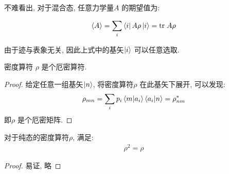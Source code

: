 不难看出, 对于混合态, 任意力学量$A$ 的期望值为:

\begin{equation}
  \begin{aligned}
    \langle A\rangle = \sum_{i} \bra{i}A \rho \ket{i} = {\rm tr} \;A \rho
  \end{aligned}
\end{equation}

由于迹与表象无关, 因此上式中的基矢$\ket{i}$ 可以任意选取.

\begin{theorem}
  密度算符 $\rho$ 是个厄密算符.
\end{theorem}
\begin{proof}
  给定任意一组基矢$\ket{n}$, 将密度算符$\rho$ 在此基矢下展开, 可以发现:
  \begin{equation}
    \begin{aligned}
      \rho_{mn} = \sum_{i}p_{i}\bra{m}\ket{a_{i}}\bra{a_{i}}\ket{n} = \rho_{nm}^{*}
    \end{aligned}
  \end{equation}
  即$\rho$ 是个厄密矩阵.
\end{proof}

\begin{theorem}
  对于纯态的密度算符$\rho$, 满足:
  \begin{equation}
    \begin{aligned}
      \rho^{2} = \rho
    \end{aligned}
  \end{equation}
\end{theorem}
\begin{proof}
  易证, 略
\end{proof}

